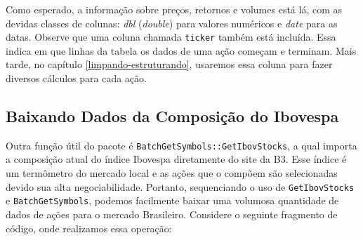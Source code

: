 \documentclass[
  11pt,
]{book}
\begin{document}
Como esperado, a informação sobre preços, retornos e volumes está lá, com as devidas classes de colunas: \emph{dbl} (\emph{double}) para valores numéricos e \emph{date} para as datas. Observe que uma coluna chamada \texttt{ticker} também está incluída. Essa indica em que linhas da tabela os dados de uma ação começam e terminam. Mais tarde, no capítulo \ref{limpando-estruturando}, usaremos essa coluna para fazer diversos cálculos para cada ação.

\hypertarget{baixando-dados-da-composiuxe7uxe3o-do-ibovespa}{%
\subsection{Baixando Dados da Composição do Ibovespa}\label{baixando-dados-da-composiuxe7uxe3o-do-ibovespa}}

Outra função útil do pacote é \texttt{BatchGetSymbols::GetIbovStocks}, a qual importa a composição atual do índice Ibovespa diretamente do site da B3. Esse índice é um termômetro do mercado local e as ações que o compõem são selecionadas devido sua alta negociabilidade. Portanto, sequenciando o uso de \texttt{GetIbovStocks} e \texttt{BatchGetSymbols}, podemos facilmente baixar uma volumosa quantidade de dados de ações para o mercado Brasileiro. Considere o seguinte fragmento de código, onde realizamos essa operação: 
\end{document}
